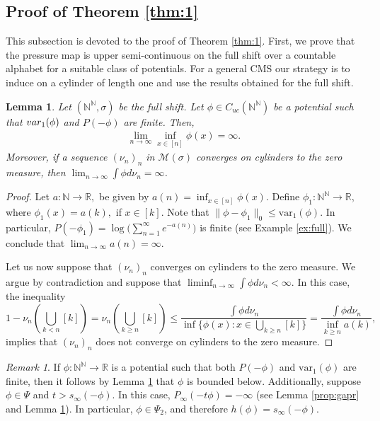 \documentclass[letterpaper,11pt]{amsart}
\theoremstyle{plain}
\theoremstyle{plain}
\newtheorem{lemma}[proposition]{Lemma}
\theoremstyle{definition}
\theoremstyle{remark}
\newtheorem{remark}{Remark}[section]
\def\R{{\mathbb R}}
\def\N{{\mathbb N}}
\def\M{{\mathcal M}}
\begin{document}
\subsection{Proof of Theorem \ref{thm:1}} This subsection is devoted to the proof of Theorem \ref{thm:1}. First, we prove that the pressure map is upper semi-continuous on the full shift over a countable alphabet for a suitable class of potentials. For a general CMS our strategy is to induce on a cylinder of length one and use the results obtained for the full shift.

\begin{lemma}\label{lem:vale1} Let $(\N^\N,\sigma)$ be the full shift. Let $\phi\in C_{uc}(\N^\N)$ be a potential such that $\emph{var}_1(\phi)$ and $P(-\phi)$ are finite. Then, \begin{align}\label{valep}\lim_{n\to\infty} \inf_{x\in [n]} \phi(x)=\infty.\end{align}
Moreover, if a sequence $(\nu_n)_n$ in $\M(\sigma)$ converges on cylinders to the zero measure, then $\lim_{n\to\infty}\int \phi d\nu_n=\infty$. 
\end{lemma}
\begin{proof} Let $a:\N\to \R,$ be given by $a(n)=\inf_{x\in [n]}\phi(x)$. Define $\phi_1:\N^\N\to \R$, where   $\phi_1(x)=a(k),$ if $x\in [k]$. Note that $\|\phi-\phi_1\|_0\le \text{var}_1(\phi)$. In particular, $P(-\phi_1)=\log\big(\sum_{n=1}^\infty e^{-a(n)}\big)$ is finite (see Example \ref{ex:full}). We conclude that $\lim_{n\to\infty} a(n)=\infty$.

Let us now suppose that  $(\nu_n)_n$ converges on cylinders to the zero measure. We argue by contradiction and suppose that $\liminf_{n\to\infty}\int \phi d\nu_n<\infty$. In this case, the inequality
$$1-\nu_n(\bigcup_{k< n}[k])=\nu_n(\bigcup_{k\ge n}[k])\le \frac{\int \phi d\nu_n}{\inf \{\phi(x):x\in \bigcup_{k\ge n}[k]\}}=\frac{\int \phi d\nu_n}{\inf_{k\ge n} a(k)}, $$
implies that $(\nu_n)_n$ does not converge on cylinders to the zero measure.\end{proof}

\begin{remark}\label{rem:fshift} If $\phi: \N^\N \to \R$ is a potential such that both $P(-\phi)$ and $\text{var}_1(\phi)$ are finite, then it follows by Lemma \ref{lem:vale1} that $\phi$ is bounded below. Additionally, suppose $\phi \in \Psi$ and $t > s_\infty(-\phi)$. In this case, $P_\infty(-t\phi) = -\infty$ (see Lemma \ref{prop:gapr}
 and Lemma \ref{lem:vale1}). In particular, $\phi \in \Psi_2$, and therefore $h(\phi)=s_\infty(-\phi)$.
\end{remark}
\end{document}
